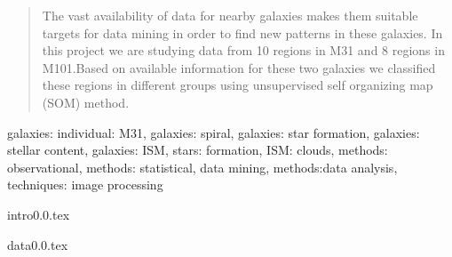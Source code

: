 \documentclass[useAMS,usenatbib]{mn2e}
\begin{document}
\begin{abstract} 
 The vast availability of data for nearby galaxies makes them suitable targets for data mining in order to find new patterns in these galaxies.
In this project we are studying data from 10 regions in M31 and 8 regions in M101.Based on available information for these two galaxies we classified these regions in different groups using unsupervised self organizing map (SOM) method.

\end{abstract}
\begin{keywords} 
galaxies: individual: M31, galaxies: spiral, galaxies: star formation, galaxies: stellar content, galaxies: ISM, stars: formation, ISM: clouds, methods: observational, methods: statistical, data mining, methods:data analysis, techniques: image processing 
\end{keywords}
{intro0.0.tex}

{data0.0.tex}

\end{document}
